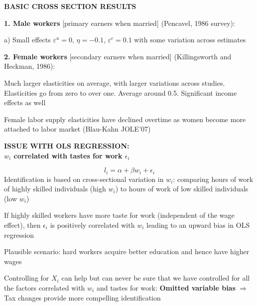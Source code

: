 \documentclass[landscape]{slides}
\begin{document}
\begin{slide}
\begin{center}
{\bf BASIC CROSS SECTION RESULTS}
\end{center}

{\bf 1. Male workers} [primary earners when married] (Pencavel,
1986 survey):

a) Small effects $\varepsilon^u=0$, $\eta=-0.1$, $\varepsilon^c=0.1$
with some variation across estimates

{\bf 2. Female workers} [secondary earners when married]
(Killingsworth and Heckman, 1986):

Much larger elasticities on average, with larger variations across
studies. Elasticities go from zero to over one. Average around
0.5. Significant income effects as well

Female labor supply elasticities have declined overtime as women
become more attached to labor market (Blau-Kahn JOLE'07)
\end{slide}


\begin{slide}
\begin{center}
{\bf ISSUE WITH OLS REGRESSION: \\ $w_i$ correlated with tastes for work $\epsilon_i$}
\end{center}
\[ l_i = \alpha + \beta w_i + \epsilon_i \]
Identification is based on cross-sectional variation in $w_i$:
comparing hours of work of highly skilled individuals (high $w_i$)
to hours of work of low skilled individuals (low $w_i$)

If highly skilled workers have more taste for work (independent of
the wage effect), then $\epsilon_i$ is positively correlated with
$w_i$ leading to an upward bias in OLS regression

Plausible scenario: hard workers acquire better education and
hence have higher wages

Controlling for $X_i$ can help but can never be sure that we have
controlled for all the factors correlated with $w_i$ and tastes
for work: {\bf Omitted variable bias} $\Rightarrow$ Tax changes
provide more compelling identification
\end{slide}




%
%
\end{document}
